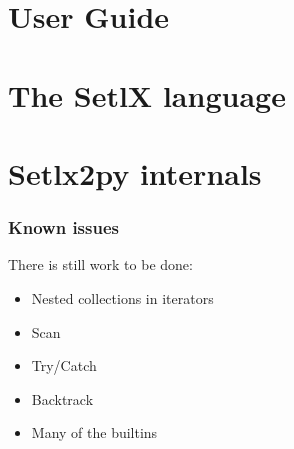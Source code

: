 \documentclass[a4paper,11pt]{article}
\begin{document}



\tableofcontents
\clearpage
\listoffigures
\printglossaries


\clearpage
\part{User Guide}







\clearpage
\part{The SetlX language}
\clearpage




\clearpage
\part{Setlx2py internals}
\clearpage







\section{Known issues}

There is still work to be done:

\begin{itemize}
	\item Nested collections in iterators
	\item Scan
	\item Try/Catch
	\item Backtrack
	\item Many of the builtins
\end{itemize}


\clearpage
\nocite{*}

\printbibliography 
\end{document}
